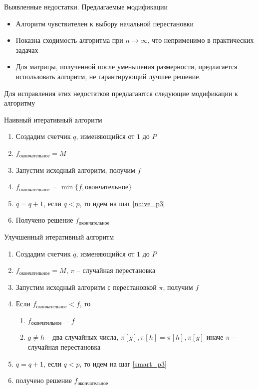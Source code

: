 \documentclass[12pt]{beamer}
\begin{document}
\begin{frame}{Выявленные недостатки. Предлагаемые модификации}
\begin{itemize}
\item Алгоритм чувствителен к выбору начальной перестановки
\item Показна сходимость алгоритма при $n \rightarrow \infty$, что неприменимо в практических задачах
\item Для матрицы, полученной после уменьшения размерности, предлагается использовать 
алгоритм, не гарантирующий лучшее решение.
\end{itemize}

Для исправления этих недостатков предлагаются следующие модификации к алгоритму
\end{frame}

\begin{frame}{Наивный итеративный алгоритм}
\begin{enumerate}
\item Создадим счетчик $q$, изменяющийся от $1$ до $P$
\item $f_{\text{окончательное}} = M$ 
\item \label{naive_p3} Запустим исходный алгоритм, получим $f$ 
\item $f_{\text{окончательное}} = \min \{ f, \text{окончательное} \}$
\item $q = q + 1$, если $q < p$, то идем на шаг \ref{naive_p3}
\item Получено решение  $f_{\text{окончательное}}$
\end{enumerate}
\end{frame}

\begin{frame}{Улучшенный итеративный алгоритм} 
\begin{enumerate}
\item Создадим счетчик $q$, изменяющийся от $1$ до $P$
\item $f_{\text{окончательное}} = M$, $\pi$ -- случайная перестановка
\item \label{smart_p3} Запустим исходный алгоритм с перестановкой $\pi$, получим $f$ 
\item Если $f_{\text{окончательное}} < f$, то
\begin{enumerate}
\item $f_{\text{окончательное}} = f$
\item $g \neq h$ -- два случайных числа, $\pi[g], \pi[h] = \pi[h], \pi[g]$
иначе $\pi$ -- случайная перестановка 
\end{enumerate}
\item $q = q + 1$, если $q < p$, то идем на шаг \ref{smart_p3}
\item получено решение  $f_{\text{окончательное}}$
\end{enumerate}
\end{frame}
\end{document}
